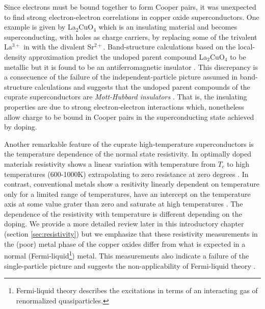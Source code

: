 Since electrons must be bound together to form Cooper pairs, it was unexpected to find strong electron-electron correlations in copper oxide superconductors. 
One example is given by La$_2$CuO$_4$ which is an insulating material and becomes superconducting, with holes as charge carriers, by replacing some of the trivalent La$^{3+}$ in with the divalent Sr$^{2+}$. 
Band-structure calculations based on the local-density approximation predict the undoped parent compound La$_2$CuO$_4$ to be metallic but it is found to be an antiferromagnetic insulator \cite{Timusk1999}.
This discrepancy is a consecuence of the failure of the independent-particle picture assumed in band-structure calculations and suggests that the undoped parent compounds of the cuprate superconductors are \textit{Mott-Hubbard insulators} \cite{Mott1949}.
That is, the insulating properties are due to strong electron-electron interactions which, nonetheless allow charge to be bound in Cooper pairs in the superconducting state achieved by doping.

Another remarkable feature of the cuprate high-temperature superconductors is the temperature dependence of the normal state resistivity.
In optimally doped materials resistivity shows a linear variation with temperature from $T_c$ to high temperatures (600-1000K) extrapolating to zero resistance at zero degrees \cite{Gurvitch1987}.
In contrast, conventional metals show a resitivity linearly dependent on temperature only for a limited range of temperatures, have an intercept on the temperature axis at some value grater than zero and saturate at high temperatures \cite{Timusk1999}.
The dependence of the resistivity with temperature is different depending on the doping. 
We provide a more detailed review later in this introductory chapter (section \ref{sec:resistivity}) but we emphasize that these resistivity measurements in the (poor) metal phase of the copper oxides differ from what is expected in a normal (Fermi-liquid\footnote{Fermi-liquid theory describes the excitations in terms of an interacting gas of renormalized quasiparticles.}) metal.
This measurements also indicate a failure of the single-particle picture and suggests the non-applicability of Fermi-liquid theory \cite{Orenstein2000}.

